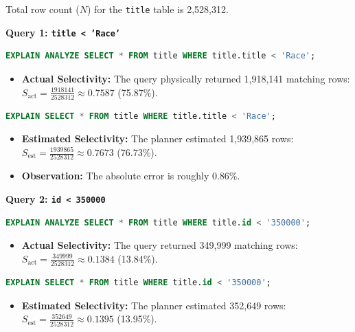 \documentclass[11pt,a4paper]{article}
\begin{document}
Total row count ($N$) for the \texttt{title} table is 2,528,312.


\textbf{Query 1: \texttt{title < 'Race'}}

\begin{lstlisting}[language=sql]
EXPLAIN ANALYZE SELECT * FROM title WHERE title.title < 'Race';
\end{lstlisting}

\begin{itemize}
\item \textbf{Actual Selectivity:} The query physically returned 1,918,141 matching rows: $S_{\text{act}} = \frac{1918141}{2528312} \approx 0.7587$ (75.87\%).
\end{itemize}

\begin{lstlisting}[language=sql]
EXPLAIN SELECT * FROM title WHERE title.title < 'Race';
\end{lstlisting}

\begin{itemize}
\item \textbf{Estimated Selectivity:} The planner estimated 1,939,865 rows: $S_{\text{est}} = \frac{1939865}{2528312} \approx 0.7673$ (76.73\%).
\end{itemize}

\begin{itemize}
\item \textbf{Observation:} The absolute error is roughly 0.86\%.
\end{itemize}

\textbf{Query 2: \texttt{id < 350000}}

\begin{lstlisting}[language=sql]
EXPLAIN ANALYZE SELECT * FROM title WHERE title.id < '350000';
\end{lstlisting}

\begin{itemize}
\item \textbf{Actual Selectivity:} The query returned 349,999 matching rows: $S_{\text{act}} = \frac{349999}{2528312} \approx 0.1384$ (13.84\%).
\end{itemize}

\begin{lstlisting}[language=sql]
EXPLAIN SELECT * FROM title WHERE title.id < '350000';
\end{lstlisting}

\begin{itemize}
\item \textbf{Estimated Selectivity:} The planner estimated 352,649 rows: $S_{\text{est}} = \frac{352649}{2528312} \approx 0.1395$ (13.95\%).
\end{itemize}
\end{document}
